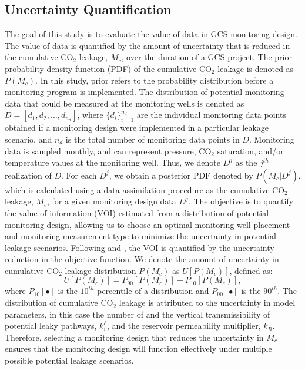 \documentclass[a4paper,fleqn]{cas-sc}
\begin{document}
\subsection{Uncertainty Quantification}
The goal of this study is to evaluate the value of data in GCS monitoring design. The value of data is quantified by the amount of uncertainty that is reduced in the cumulative CO$_2$ leakage, $M_c$, over the duration of a GCS project. The prior probability density function (PDF) of the cumulative CO$_2$ leakage is denoted as $P(M_c)$. In this study, prior refers to the probability distribution before a monitoring program is implemented. The distribution of potential monitoring data that could be measured at the monitoring wells is denoted as $D=[d_1,d_2,\ldots,d_{n_d}]$, where $\{d_i\}_{i=1}^{n_d}$ are the individual monitoring data points obtained if a monitoring design were implemented in a particular leakage scenario, and $n_d$ is the total number of monitoring data points in $D$. Monitoring data is sampled monthly, and can represent pressure, CO$_2$ saturation, and/or temperature values at the monitoring well. Thus, we denote $D^j$ as the $j^{th}$ realization of $D$. For each $D^j$, we obtain a posterior PDF denoted by $P(M_c \vert D^j)$, which is calculated using a data assimilation procedure as the cumulative CO$_2$ leakage, $M_c$, for a given monitoring design data $D^j$. The objective is to quantify the value of information (VOI) estimated from a distribution of potential monitoring design, allowing us to choose an optimal monitoring well placement and monitoring measurement type to minimize the uncertainty in potential leakage scenarios.
Following \citet{Chen2017328, Chen2018} and \citet{Le2014505}, the VOI is quantified by the uncertainty reduction in the objective function. We denote the amount of uncertainty in cumulative CO$_2$ leakage distribution $P(M_c)$ as $U[P(M_c)]$, defined as:
\begin{equation} \label{eq:1}
    U[P(M_c)] = P_{90}[P(M_c)] - P_{10}[P(M_c)] ,
\end{equation}
where $P_{10}[\bullet]$ is the $10^{th}$ percentile of a distribution and $P_{90}[\bullet]$ is the $90^{th}$. The distribution of cumulative CO$_2$ leakage is attributed to the uncertainty in model parameters, in this case the number of and the vertical transmissibility of potential leaky pathways, $k_v^\ell$, and the reservoir permeability multiplier, $k_R$. Therefore, selecting a monitoring design that reduces the uncertainty in $M_c$ ensures that the monitoring design will function effectively under multiple possible potential leakage scenarios.
\end{document}
